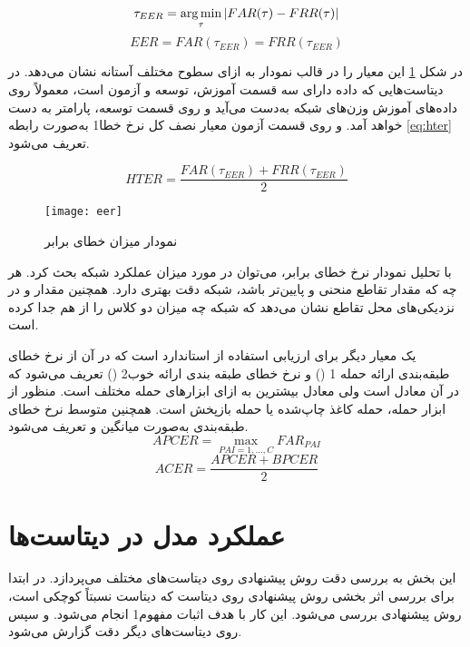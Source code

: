 \begin{equation}\label{eq:taueer}
	\tau_{EER} = \operatorname*{arg\,min}_{\tau}|FAR(\tau)-FRR(\tau)|
\end{equation}
\begin{equation}\label{eq:eer}
	EER=FAR(\tau_{EER})=FRR(\tau_{EER})
\end{equation}

در شکل
\ref{fig:eer}
این معیار را در قالب نمودار به ازای سطوح مختلف آستانه نشان می‌دهد. در دیتاست‌هایی که داده دارای سه قسمت آموزش، توسعه و آزمون است، معمولاً روی داده‌های آموزش وزن‌های شبکه به‌دست می‌آید و روی قسمت توسعه، پارامتر   به دست خواهد آمد. و روی قسمت آزمون معیار نصف کل نرخ خطا1 به‌صورت رابطه
\ref{eq:hter}
تعریف می‌شود.

\begin{equation}\label{eq:hter}
	HTER=\frac{FAR(\tau_{EER})+FRR(\tau_{EER})}{2}
\end{equation}

 \begin{figure}[ht]
	\centerline{\texttt{[image: eer]}}
	\caption{نمودار میزان خطای برابر}
	\label{fig:eer}
\end{figure}

با تحلیل نمودار نرخ خطای برابر، می‌توان در مورد میزان عملکرد شبکه بحث کرد. هر چه که مقدار تقاطع منحنی  و  پایین‌تر باشد، شبکه دقت بهتری دارد. همچنین مقدار  و  در نزدیکی‌های محل تقاطع نشان می‌دهد که شبکه چه میزان دو کلاس را از هم جدا کرده است.

یک معیار دیگر برای ارزیابی استفاده از استاندارد
است که در آن از نرخ خطای طبقه‌بندی ارائه حمله 1 () و نرخ خطای طبقه بندی ارائه خوب2 () تعریف می‌شود که در آن  معادل  است ولی  معادل بیشترین  به ازای ابزارهای حمله مختلف است.
منظور از ابزار حمله، حمله کاغذ چاپ‌شده یا حمله بازپخش است. همچنین متوسط نرخ خطای طبقه‌بندی به‌صورت میانگین  و  تعریف می‌شود.
\begin{equation}\label{eq:apcer}
	APCER=\max_{PAI=1,...,C}{FAR_{PAI}}
\end{equation}
\begin{equation}\label{eq:ACER}
	ACER=\frac{APCER+BPCER}{2}
\end{equation}
\section{عملکرد مدل در دیتاست‌ها}
این بخش به بررسی دقت روش پیشنهادی روی دیتاست‌های مختلف می‌پردازد. در ابتدا برای بررسی اثر بخشی روش پیشنهادی روی دیتاست  که دیتاست نسبتاً کوچکی است، روش پیشنهادی بررسی می‌شود. این کار با هدف اثبات مفهوم1 انجام می‌شود. و سپس روی دیتاست‌های دیگر دقت گزارش می‌شود.

